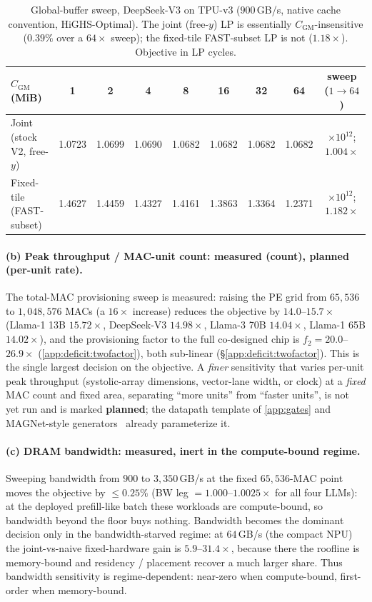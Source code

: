 \begin{table}[ht!]
\centering
\caption{Global-buffer sweep, DeepSeek-V3 on TPU-v3 ($900$\,GB/s, native cache
convention, HiGHS-Optimal). The joint (free-$y$) LP is essentially
$C_{\mathrm{GM}}$-insensitive ($0.39\%$ over a $64\times$ sweep); the fixed-tile
FAST-subset LP is not ($1.18\times$). Objective in LP cycles.}
\label{tab:deficit_cgm}
\small
\begin{tabular}{@{}lcccccccc@{}}
\toprule
$C_{\mathrm{GM}}$ (MiB) & 1 & 2 & 4 & 8 & 16 & 32 & 64 & sweep ($1\!\to\!64$) \\
\midrule
Joint (stock V2, free-$y$) & 1.0723 & 1.0699 & 1.0690 & 1.0682 & 1.0682
& 1.0682 & 1.0682 & $\times10^{12}$; $1.004\times$ \\
Fixed-tile (FAST-subset)   & 1.4627 & 1.4459 & 1.4327 & 1.4161 & 1.3863
& 1.3364 & 1.2371 & $\times10^{12}$; $1.182\times$ \\
\bottomrule
\end{tabular}
\end{table}

\paragraph{(b) Peak throughput / MAC-unit count: measured (count), planned
(per-unit rate).} The total-MAC provisioning sweep is measured: raising the PE
grid from $65{,}536$ to $1{,}048{,}576$ MACs (a $16\times$ increase) reduces the
objective by $14.0$--$15.7\times$ (Llama-1 13B $15.72\times$, DeepSeek-V3
$14.98\times$, Llama-3 70B $14.04\times$, Llama-1 65B $14.02\times$), and the
provisioning factor to the full co-designed chip is $f_2=20.0$--$26.9\times$
(\cref{app:deficit:twofactor}), both sub-linear (\S\ref{app:deficit:twofactor}).
This is the single largest decision on the objective. A \emph{finer} sensitivity
that varies per-unit peak throughput (systolic-array dimensions, vector-lane
width, or clock) at a \emph{fixed} MAC count and fixed area, separating
``more units'' from ``faster units'', is not yet run and is marked
\textcolor{orange!85!black}{\textbf{planned}}; the datapath template of
\cref{app:gates} and MAGNet-style generators~\citep{venkatesan2019magnet}
already parameterize it.

\paragraph{(c) DRAM bandwidth: measured, inert in the compute-bound regime.}
Sweeping bandwidth from $900$ to $3{,}350$\,GB/s at the fixed $65{,}536$-MAC
point moves the objective by $\le0.25\%$ (BW leg $=1.000$--$1.0025\times$ for
all four LLMs): at the deployed prefill-like batch these workloads are
compute-bound, so bandwidth beyond the floor buys nothing. Bandwidth becomes the
dominant decision only in the bandwidth-starved regime: at $64$\,GB/s (the compact
NPU) the joint-vs-naive fixed-hardware gain is $5.9$--$31.4\times$, because there
the roofline is memory-bound and residency / placement recover a much larger
share. Thus bandwidth sensitivity is regime-dependent: near-zero when
compute-bound, first-order when memory-bound.

